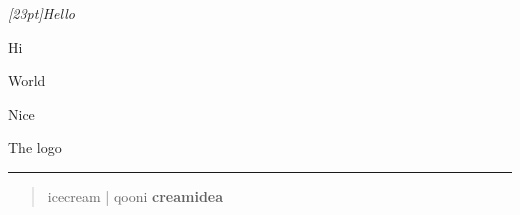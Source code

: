 \documentclass[12pt, titlepage]{article}
\begin{document}
\emph{[23pt]Hello}

Hi

\mbox{World}

Nice

The {\LaTeXe} logo

\rule{10mm}{3mm}

\begin{quote}
icecream | \small qooni \bfseries creamidea
\end{quote}
\end{document}
